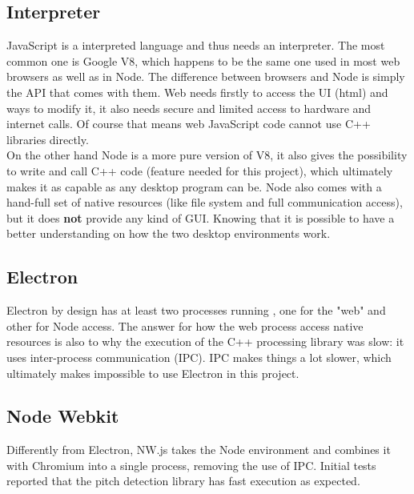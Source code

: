 \subsection{Interpreter}
JavaScript is a interpreted language and thus needs an interpreter. The most
common one is Google V8, which happens to be the same one used in most web
browsers as well as in Node. The difference between browsers and Node is simply
the API that comes with them. Web needs firstly to access the UI (html) and ways to
modify it, it also needs secure and limited access to hardware and internet calls.
Of course that means web JavaScript code cannot use C++ libraries directly. \\
On the other hand Node is a more pure version of V8, it also gives the possibility
to write and call C++ code (feature needed for this project), which ultimately
makes it as capable as any desktop
program can be. Node also comes with a hand-full set of native resources (like
file system and full communication access), but it does \textbf{not} provide
any kind of GUI. Knowing that it is possible to have a better understanding on
how the two desktop environments work.

\subsection{Electron}
Electron by design has at least two processes running \cite{ElectronVsNW},
one for the "web" and other
for Node access. The answer for how the web process access native resources is
also to why the execution of the C++ processing library was slow: it uses
inter-process communication (IPC). IPC makes things a lot slower, which ultimately
makes impossible to use Electron in this project.

\subsection{Node Webkit}
Differently from Electron, NW.js \cite{NWjs, ElectronVsNW} takes the Node environment
and combines it with Chromium into a single process, removing the use of IPC.
Initial tests reported that the pitch detection library has fast
execution as expected.

